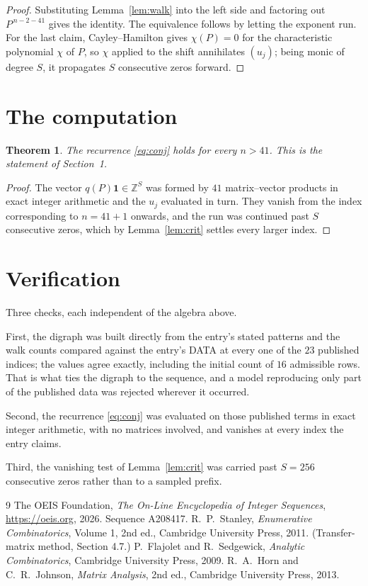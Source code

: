 \documentclass[11pt,a4paper]{article}
\theoremstyle{plain}
\newtheorem{theorem}{Theorem}
\theoremstyle{definition}
\begin{document}
\begin{proof}
Substituting Lemma~\ref{lem:walk} into the left side and factoring out
$P^{\,n-2-41}$ gives the identity. The equivalence follows by letting the exponent
run. For the last claim, Cayley--Hamilton gives $\chi(P)=0$ for the characteristic
polynomial $\chi$ of $P$, so $\chi$ applied to the shift annihilates $(u_j)$; being monic of
degree $S$, it propagates $S$ consecutive zeros forward.
\end{proof}

\section{The computation}

\begin{theorem}
The recurrence \eqref{eq:conj} holds for every $n>41$. This is the statement of
Section~1.
\end{theorem}

\begin{proof}
The vector $q(P)\mathbf{1}\in\mathbb{Z}^{S}$ was formed by $41$ matrix--vector
products in exact integer arithmetic and the $u_j$ evaluated in turn. They vanish from the
index corresponding to $n=41+1$ onwards, and the run was continued past $S$ consecutive
zeros, which by Lemma~\ref{lem:crit} settles every larger index.
\end{proof}

\section{Verification}

Three checks, each independent of the algebra above.

First, the digraph was built directly from the entry's stated patterns and the walk counts
compared against the entry's DATA at every one of the $23$ published indices; the
values agree exactly, including the initial count of $16$ admissible rows. That is
what ties the digraph to the sequence, and a model reproducing only part of the published
data was rejected wherever it occurred.

Second, the recurrence \eqref{eq:conj} was evaluated on those published terms in exact
integer arithmetic, with no matrices involved, and vanishes at every index the entry claims.

Third, the vanishing test of Lemma~\ref{lem:crit} was carried past $S=256$ consecutive
zeros rather than to a sampled prefix.

\begin{thebibliography}{9}
 The OEIS Foundation, \emph{The On-Line Encyclopedia of Integer
Sequences}, \url{https://oeis.org}, 2026. Sequence A208417.
 R.~P.~Stanley, \emph{Enumerative Combinatorics}, Volume 1, 2nd ed.,
Cambridge University Press, 2011. (Transfer-matrix method, Section 4.7.)
 P.~Flajolet and R.~Sedgewick, \emph{Analytic Combinatorics}, Cambridge
University Press, 2009.
 R.~A.~Horn and C.~R.~Johnson, \emph{Matrix Analysis}, 2nd ed., Cambridge
University Press, 2013.
\end{thebibliography}
\end{document}
